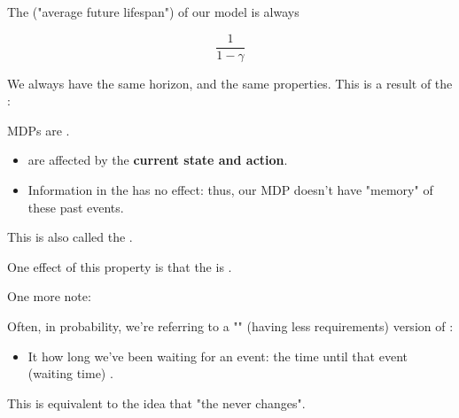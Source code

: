         \begin{kequation}
            The  ("average future lifespan") of our model is always 

            \begin{equation*}
                \frac{1}{1-\gamma}
            \end{equation*}
        \end{kequation}

        We always have the same horizon, and the same properties. This is a result of the :\\

        \begin{definition}
            MDPs are .

            \begin{itemize}
                \item {} are  affected by the \textbf{current state and action}.

                \item Information in the  has no effect: thus, our MDP doesn't have "memory" of these past events.
            \end{itemize}

            This is also called the .

            \subsecdiv

            One effect of this property is that the  is .
        \end{definition}

        One more note:\\

        \begin{remark}
            Often, in probability, we're referring to a "" (having less requirements) version of :

            \begin{itemize}
                \item It  how long we've been waiting for an event: the time until that event (waiting time) .
            \end{itemize}

            This is equivalent to the idea that "the  never changes".
        \end{remark}

